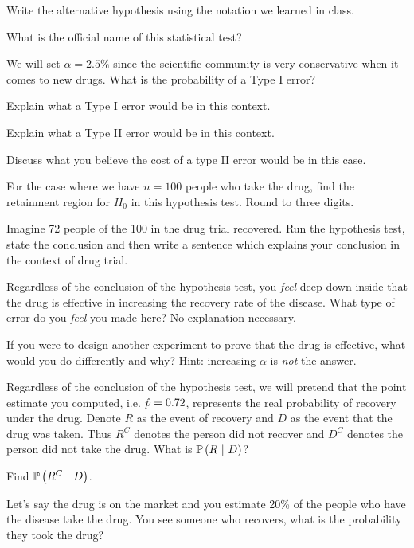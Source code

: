 \documentclass[12pt]{article}
\begin{document}
 Write the alternative hypothesis using the notation we learned in class. 

 What is the official name of this statistical test? 


 We will set $\alpha = 2.5\%$ since the scientific community is very conservative when it comes to new drugs. What is the probability of a Type I error?

 Explain what a Type I error would be in this context.

 Explain what a Type II error would be in this context.

 Discuss what you believe the cost of a type II error would be in this case. 

 For the case where we have $n=100$ people who take the drug, find the retainment region for $H_0$ in this hypothesis test. Round to three digits. 

 Imagine 72 people of the 100 in the drug trial recovered. Run the hypothesis test, state the conclusion and then write a sentence which explains your conclusion in the context of drug trial. 


 Regardless of the conclusion of the hypothesis test, you \emph{feel} deep down inside that the drug is effective in increasing the recovery rate of the disease. What type of error do you \emph{feel} you made here? No explanation necessary. 


 If you were to design another experiment to prove that the drug is effective, what would you do differently and why? Hint: increasing $\alpha$ is \textit{not} the answer. 

 Regardless of the conclusion of the hypothesis test, we will pretend that the point estimate you computed, i.e. $\hat{p} = 0.72$, represents the real probability of recovery under the drug. Denote $R$ as the event of recovery and $D$ as the event that the drug was taken. Thus $R^C$ denotes the person did not recover and $D^C$ denotes the person did not take the drug. What is $\mathbb{P}\left(R~|~D\right)$? 

 Find $\mathbb{P}\left(R^C~|~D\right)$.

 Let's say the drug is on the market and you estimate 20\% of the people who have the disease take the drug. You see someone who recovers, what is the probability they took the drug? 
\end{document}
